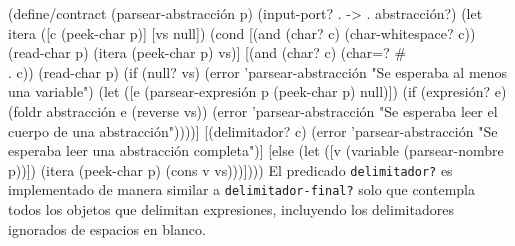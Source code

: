 \documentclass[10pt,oneside,openany,letterpaper]{book}
\begin{document}
\nwenddocs{}\plusendmoddef
(define/contract (parsear-abstracción p)
  (input-port? . -> . abstracción?)
  (let itera ([c  (peek-char p)]
              [vs null])
    (cond [(and (char? c) (char-whitespace? c))
           (read-char p)
           (itera (peek-char p) vs)]
          [(and (char? c) (char=? #\\. c))
           (read-char p)
           (if (null? vs)
               (error 'parsear-abstracción "Se esperaba al menos una variable")
               (let ([e (parsear-expresión p (peek-char p) null)])
                 (if (expresión? e)
                     (foldr abstracción e (reverse vs))
                     (error 'parsear-abstracción
                            "Se esperaba leer el cuerpo de una abstracción"))))]
          [(delimitador? c)
           (error 'parsear-abstracción "Se esperaba leer una abstracción completa")]
          [else
           (let ([v (variable (parsear-nombre p))])
             (itera (peek-char p) (cons v vs)))])))
\eatline
{}\nwendcode{}\nwdocspar
El predicado {\tt{}\protect{}delimitador?} es implementado de manera similar a {\tt{}\protect{}delimitador-final?} solo que contempla todos los objetos que delimitan expresiones, incluyendo los delimitadores ignorados de espacios en blanco.
\end{document}
